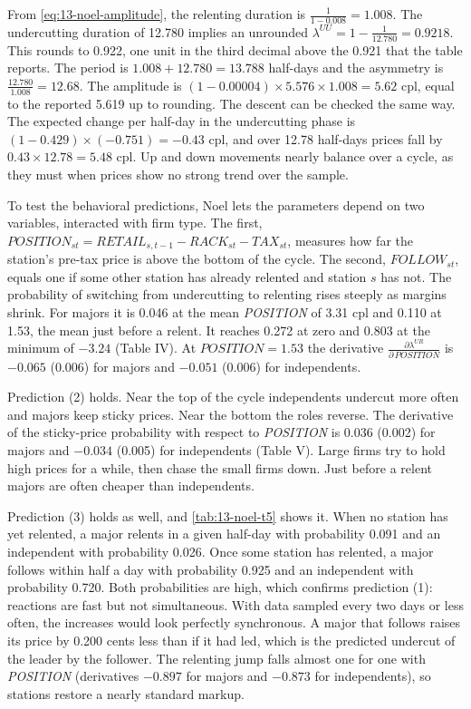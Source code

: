 \begin{example}\label{ex:13-noel-cycle}
From \eqref{eq:13-noel-amplitude}, the relenting duration is $\frac{1}{1-0.008}=1.008$. The undercutting duration of
12.780 implies an unrounded $\lambda^{UU}=1-\frac{1}{12.780}=0.9218$. This rounds to 0.922, one unit in the third
decimal above the 0.921 that the table reports. The period is
$1.008+12.780=13.788$ half-days and the asymmetry is $\frac{12.780}{1.008}=12.68$. The amplitude is
$(1-0.00004)\times5.576\times1.008=5.62$ cpl, equal to the reported 5.619 up to rounding. The descent can be checked
the same way. The expected change per half-day in the undercutting phase is $(1-0.429)\times(-0.751)=-0.43$ cpl, and
over 12.78 half-days prices fall by $0.43\times12.78=5.48$ cpl. Up and down movements nearly balance over a cycle, as
they must when prices show no strong trend over the sample.
\end{example}

To test the behavioral predictions, Noel lets the parameters depend on two variables, interacted with firm type.
The first, $\textit{POSITION}_{st}=\textit{RETAIL}_{s,t-1}-\textit{RACK}_{st}-\textit{TAX}_{st}$, measures how far the
station's pre-tax price is above the bottom of the cycle. The second, $\textit{FOLLOW}_{st}$, equals one if some other
station has already relented and station $s$ has not. The probability of switching from undercutting to relenting
rises steeply as margins shrink. For majors it is 0.046 at the mean \textit{POSITION} of 3.31 cpl and 0.110 at 1.53,
the mean just before a relent. It reaches 0.272 at zero and 0.803 at the minimum of $-3.24$ (Table IV). At
$\textit{POSITION}=1.53$ the derivative $\frac{\partial\lambda^{UR}}{\partial\,\textit{POSITION}}$ is $-0.065$ (0.006)
for majors and $-0.051$ (0.006) for independents.

Prediction (2) holds. Near the top of the cycle independents undercut more often and majors keep sticky prices.
Near the bottom the roles reverse. The derivative of the sticky-price probability with respect to \textit{POSITION} is
0.036 (0.002) for majors and $-0.034$ (0.005) for independents (Table V). Large firms try to hold high prices for a
while, then chase the small firms down. Just before a relent majors are often cheaper than independents.

Prediction (3) holds as well, and \cref{tab:13-noel-t5} shows it. When no station has yet relented, a major
relents in a given half-day with probability 0.091 and an independent with probability 0.026. Once some station has
relented, a major follows within half a day with probability 0.925 and an independent with probability 0.720. Both
probabilities are high, which confirms prediction (1): reactions are fast but not simultaneous. With data sampled
every two days or less often, the increases would look perfectly synchronous. A major that follows raises its price
by 0.200 cents less than if it had led, which is the predicted undercut of the leader by the follower. The relenting
jump falls almost one for one with \textit{POSITION} (derivatives $-0.897$ for majors and $-0.873$ for independents),
so stations restore a nearly standard markup.

